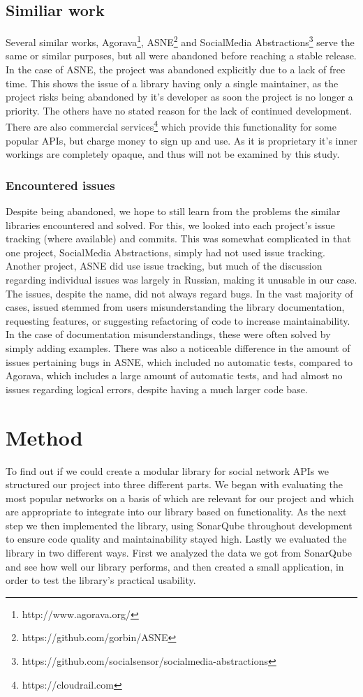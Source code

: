 \documentclass{sigchi-alternate}
\begin{document}
\subsection{Similiar work}
Several similar works, Agorava\footnote{http://www.agorava.org/}, ASNE\footnote{https://github.com/gorbin/ASNE} and 
SocialMedia Abstractions\footnote{https://github.com/socialsensor/socialmedia-abstractions} serve the same or similar purposes, but all were abandoned before reaching a 
stable release. In the case of ASNE, the project was abandoned explicitly due to a lack of free time. This shows the issue of a library having only a single maintainer, 
as the project risks being abandoned by it's developer as soon the project is no longer a priority. The others have no stated reason for the lack of continued development.
There are also commercial services\footnote{https://cloudrail.com} which provide this functionality for some popular APIs, but charge money to sign up 
and use. As it is proprietary it's inner workings are completely opaque, and thus will not be examined by this study.

\subsubsection{Encountered issues}
Despite being abandoned, we hope to still learn from the problems the similar libraries encountered and solved. For this, we looked into each project's issue
tracking (where available) and commits. This was somewhat complicated in that one project, SocialMedia Abstractions, simply had not used issue tracking. 
Another project, ASNE did use issue tracking, but much of the discussion regarding individual issues was largely in Russian, making it unusable in our case. 
The issues, despite the name, did not always regard bugs. In the vast majority of cases, issued stemmed from users misunderstanding the library documentation,
requesting features, or suggesting refactoring of code to increase maintainability. In the case of documentation misunderstandings, these were often
solved by simply adding examples. There was also a noticeable difference in the amount of issues pertaining bugs in ASNE, which included no automatic tests,
compared to Agorava, which includes a large amount of automatic tests, and had almost no issues regarding logical errors, despite having a much larger code base.

\section{Method}
To find out if we could create a modular library for social network APIs we structured our project into three different parts. We began with evaluating the most 
popular networks on a basis of which are relevant for our project and which are appropriate to integrate into our library based on functionality. As the next step we then implemented
the library, using SonarQube throughout development to ensure code quality and maintainability stayed high. Lastly we evaluated the library in two different ways.
First we analyzed the data we got from SonarQube and see how well our library performs, and then created a small application, in order to test the library's practical usability.
\end{document}
